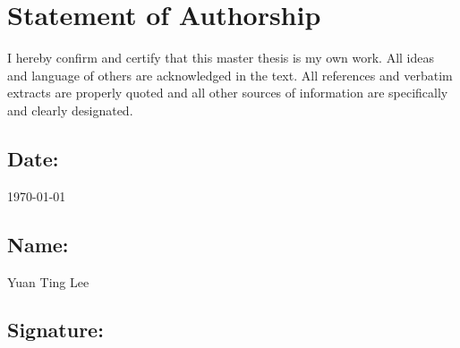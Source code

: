 \documentclass[12pt,onecolumn,twoside]{layout}
\begin{document}

\clearpage

\section{Statement of Authorship}
I hereby confirm and certify that this master thesis is my own work. All ideas and language of others are acknowledged in the text. All references and verbatim extracts are properly quoted and all other sources of information are specifically and clearly designated. 

\subsection*{Date:} \today


\subsection*{Name:} Yuan Ting Lee


\subsection*{Signature:}
\end{document}
